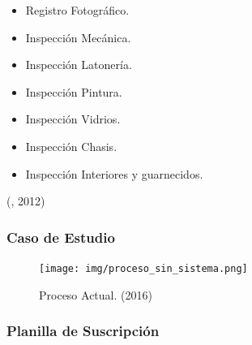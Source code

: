 \begin{itemize}

	\item Registro Fotográfico.

	\item Inspección Mecánica.

	\item Inspección Latonería.

	\item Inspección Pintura.

	\item Inspección Vidrios.

	\item Inspección Chasis.

	\item Inspección Interiores y guarnecidos.

\end{itemize}

(\citet{peritoIVbib}, 2012)

\newpage

\subsubsection{Caso de Estudio}

\begin{figure}[H]
\begin{center}
	\texttt{[image: img/proceso\_sin\_sistema.png]}
\end{center}
\caption{Proceso Actual. (2016)}
\label{fig:proc_sin_sistema}
\end{figure}
\setlength{\parskip}{0mm}


\newpage

\subsubsection{Planilla de Suscripción}

